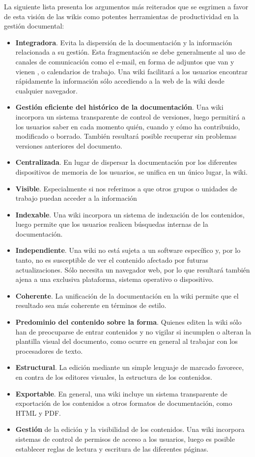 \documentclass[12pt, a4paper,twoside]{book}
\begin{document}
La siguiente lista presenta los argumentos más reiterados que se
esgrimen a favor de esta visión de las wikis como potentes
herramientas de productividad en la gestión documental:

\begin{itemize}
\item
  \textbf{Integradora}. Evita la dispersión de la documentación y la
  información relacionada a su gestión. Esta fragmentación se debe
  generalmente al uso de canales de comunicación como el e-mail, en
  forma de adjuntos que van y vienen , o calendarios de trabajo. Una
  wiki facilitará a los usuarios encontrar rápidamente la información
  sólo accediendo a la web de la wiki desde cualquier navegador.
\item
  \textbf{Gestión eficiente del histórico de la documentación}. Una
  wiki incorpora un sistema transparente de control de versiones,
  luego permitirá a los usuarios saber en cada momento quién, cuando
  y cómo ha contribuido, modificado o borrado. También resultará
  posible recuperar sin problemas versiones anteriores del documento.
\item
  \textbf{Centralizada}. En lugar de dispersar la documentación por
  los diferentes dispositivos de memoria de los usuarios, se unifica
  en un único lugar, la wiki.
\item
  \textbf{Visible}. Especialmente si nos referimos a que otros grupos
  o unidades de trabajo puedan acceder a la información
\item
  \textbf{Indexable}. Una wiki incorpora un sistema de indexación de
  los contenidos, luego permite que los usuarios realicen búsquedas
  internas de la documentación.
\item
  \textbf{Independiente}. Una wiki no está sujeta a un software
  específico y, por lo tanto, no es susceptible de ver el contenido
  afectado por futuras actualizaciones. Sólo necesita un navegador
  web, por lo que resultará también ajena a una exclusiva plataforma,
  sistema operativo o dispositivo.
\item
  \textbf{Coherente}. La unificación de la documentación en la wiki
  permite que el resultado sea más coherente en términos de estilo.
\item
  \textbf{Predominio del contenido sobre la forma}. Quienes editen la
  wiki sólo han de preocuparse de entrar contenidos y no vigilar si
  incumplen o alteran la plantilla visual del documento, como ocurre
  en general al trabajar con los procesadores de texto.
\item
  \textbf{Estructural}. La edición mediante un simple lenguaje de
  marcado favorece, en contra de los editores visuales, la estructura
  de los contenidos.
\item
  \textbf{Exportable}. En general, una wiki incluye un sistema
  transparente de exportación de los contenidos a otros formatos de
  documentación, como HTML y PDF.
\item
  \textbf{Gestión} de la edición y la visibilidad de los contenidos.
  Una wiki incorpora sistemas de control de permisos de acceso a los
  usuarios, luego es posible establecer reglas de lectura y escritura
  de las diferentes páginas.
\end{itemize}
\end{document}
